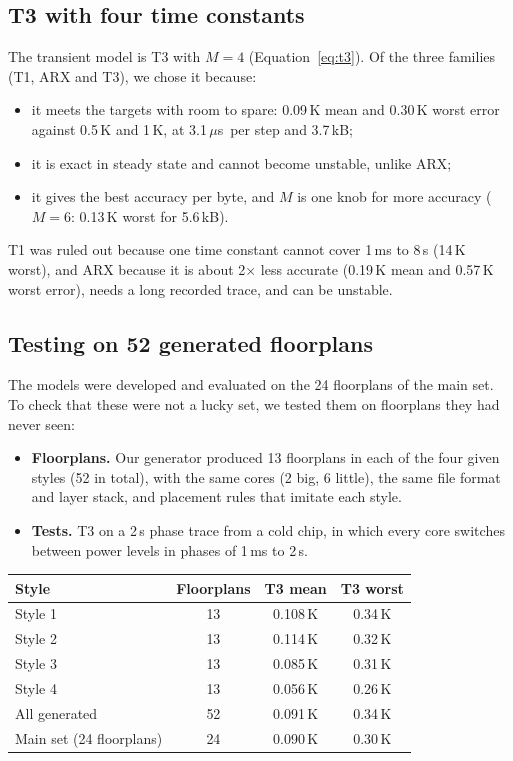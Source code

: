\documentclass[11pt,a4paper]{article}
\newcommand{\us}{\,$\mu$s}
\begin{document}
\subsection{T3 with four time constants}
The transient model is T3 with $M=4$ (Equation~\eqref{eq:t3}). Of the three families (T1, ARX
and T3), we chose it because:
\begin{itemize}
  \item it meets the targets with room to spare: 0.09\,K mean and 0.30\,K worst error against
        0.5\,K and 1\,K, at 3.1\us\ per step and 3.7\,kB;
  \item it is exact in steady state and cannot become unstable, unlike ARX;
  \item it gives the best accuracy per byte, and $M$ is one knob for more accuracy ($M=6$: 0.13\,K
        worst for 5.6\,kB).
\end{itemize}
T1 was ruled out because one time constant cannot cover 1\,ms to 8\,s (14\,K worst), and ARX
because it is about 2$\times$ less accurate (0.19\,K mean and 0.57\,K worst error), needs a long
recorded trace, and can be unstable.

\subsection{Testing on 52 generated floorplans}\label{sec:gen}
The models were developed and evaluated on the 24 floorplans of the main set. To check that these
were not a lucky set, we tested them on floorplans they had never seen:
\begin{itemize}
  \item \textbf{Floorplans.} Our generator produced 13 floorplans in each of the four given styles
        (52 in total), with the same cores (2 big, 6 little), the same file format and layer
        stack, and placement rules that imitate each style.
  \item \textbf{Tests.} T3 on a 2\,s phase trace from a cold chip, in which every core switches
        between power levels in phases of 1\,ms to 2\,s.
\end{itemize}

\begin{center}
\small
\begin{tabular}{@{}l c c c@{}}
\toprule
Style & Floorplans & T3 mean & T3 worst \\
\midrule
Style 1 & 13 & 0.108\,K & 0.34\,K \\
Style 2 & 13 & 0.114\,K & 0.32\,K \\
Style 3 & 13 & 0.085\,K & 0.31\,K \\
Style 4 & 13 & 0.056\,K & 0.26\,K \\
All generated & 52 & 0.091\,K & 0.34\,K \\
Main set (24 floorplans) & 24 & 0.090\,K & 0.30\,K \\
\bottomrule
\end{tabular}
\end{center}
\end{document}
